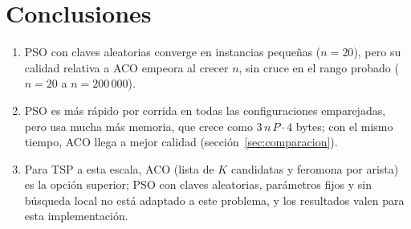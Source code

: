 \documentclass[12pt,a4paper]{article}
\begin{document}


\section{Conclusiones}
\begin{enumerate}
\item PSO con claves aleatorias converge en instancias pequeñas ($n=20$), pero su calidad relativa a ACO empeora al crecer $n$, sin cruce en el rango probado ($n=20$ a $n=200\,000$).
\item PSO es más rápido por corrida en todas las configuraciones emparejadas, pero usa mucha más memoria, que crece como $3\,n\,P\cdot4$ bytes; con el mismo tiempo, ACO llega a mejor calidad (sección~\ref{sec:comparacion}).
\item Para TSP a esta escala, ACO (lista de $K$ candidatas y feromona por arista) es la opción superior; PSO con claves aleatorias, parámetros fijos y sin búsqueda local no está adaptado a este problema, y los resultados valen para esta implementación.
\end{enumerate}


\end{document}

